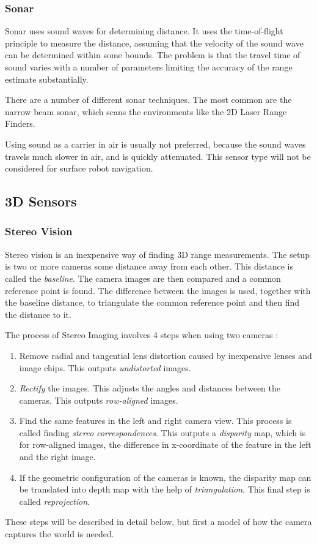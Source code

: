 \subsubsection{Sonar}
Sonar uses sound waves for determining distance. It uses the time-of-flight principle
to measure the distance, assuming that the velocity of the sound wave can be determined
within some bounds. The problem is that the travel time of sound varies with a
number of parameters limiting the accuracy of the range estimate substantially. 

There are a number of different sonar techniques. The most common are the narrow beam
sonar, which scans the environments like the 2D Laser Range Finders. \cite{mathisen}

Using sound as a carrier in air is usually not preferred, because the sound waves travels
much slower in air, and is quickly attenuated. This sensor type will not be considered for
surface robot navigation.


\subsection{3D Sensors}

\subsubsection{Stereo Vision}
Stereo vision is an inexpensive way of finding 3D range measurements. The setup is two or
more cameras some distance away from each other. This distance is called the
\emph{baseline}. The camera images are then compared and a common reference point is
found. The difference between the images is used, together with the baseline distance,
to triangulate the common reference point and then find the distance to it. 

The process of Stereo Imaging involves 4 steps when using two cameras \cite{openCV}:
\begin{enumerate}
    \item Remove radial and tangential lens distortion caused by inexpensive lenses and
        image chips. This outputs \emph{undistorted} images. 
    \item \emph{Rectify} the images. This adjusts the angles and distances between the cameras.
        This outputs \emph{row-aligned} images.
    \item Find the same features in the left and right camera view. This process is called
        finding \emph{stereo correspondences}. This outputs a \emph{disparity} map, which
        is for row-aligned images, the difference in x-coordinate of the feature in the left and the right image. 
    \item If the geometric configuration of the cameras is known, the disparity map can
        be translated into depth map with the help of \emph{triangulation}. This final
        step is called \emph{reprojection}.
\end{enumerate}
These steps will be described in detail below, but first a model of how the camera captures
the world is needed. 


